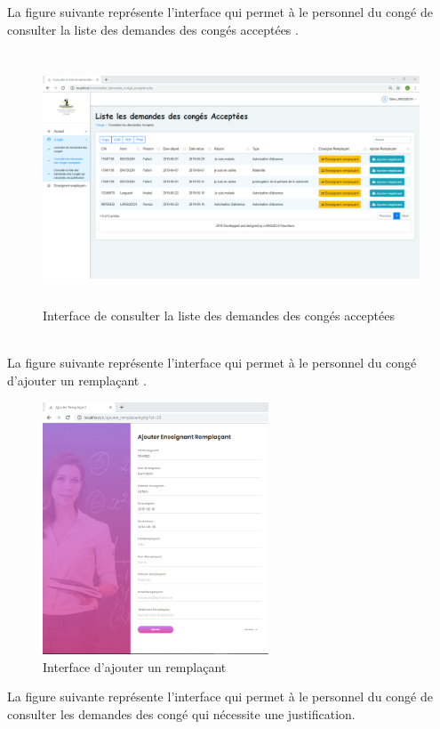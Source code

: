 \documentclass[12 pt ]{report}
\begin{document}
\newpage
La figure suivante représente l'interface qui permet à le personnel du congé de consulter la liste des demandes des congés acceptées .
\begin{figure}[h]
 \begin{center}
\includegraphics[width= 15 cm ,height=7.5cm]{consulter_demande_conge_accepter2.PNG}
\caption{Interface de consulter la liste des demandes des congés acceptées }

\end{center}
\end{figure} \\
La figure suivante représente l'interface qui permet à le personnel du congé d'ajouter un remplaçant .
\begin{figure}[h]
 \begin{center}
\includegraphics[width= 15 cm ,height=7.5cm]{Ajouter_remplacant.PNG}
\caption{Interface d'ajouter un remplaçant  }

\end{center}
\end{figure} 
\newpage
La figure suivante représente l'interface qui permet à le personnel du congé de consulter les demandes des  congé  qui nécessite une justification.
\end{document}
